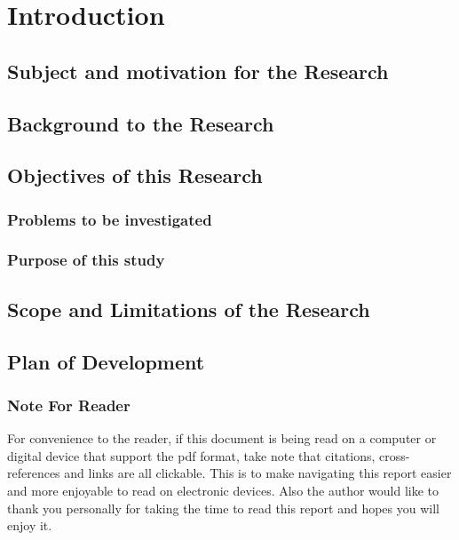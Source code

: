 \documentclass[a4paper,11pt]{article}
\numberwithin{figure}{section}
\numberwithin{table}{section}
\begin{document}
\section{Introduction}
	\subsection{Subject and motivation for the Research}
	\subsection{Background to the Research}
	\subsection{ Objectives of this Research}
		\subsubsection{Problems to be investigated}
		\subsubsection{Purpose of this study}
	\subsection{Scope and Limitations of the Research}
	\subsection{Plan of Development}	
	\subsubsection{Note For Reader}
	For convenience to the reader, if this document is being read on a computer or digital device that support the pdf format, take note that citations, cross-references and links are all clickable. This is to make navigating this report easier and more enjoyable to read on electronic devices. Also the author would like to thank you personally for taking the time to read this report and hopes you will enjoy it.
	\newpage
\setlength{\parskip}{1em}
\end{document}
